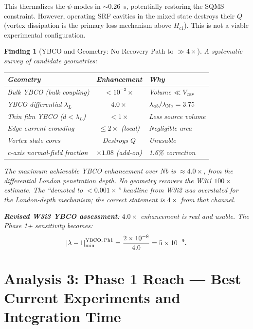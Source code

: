 \documentclass[11pt]{article}
\newtheorem{finding}{Finding}
\newcommand{\ee}[1]{\times 10^{#1}}
\newcommand{\lam}{\lambda}
\begin{document}
This thermalizes the $\psi$-modes in $\sim 0.26$~s, potentially restoring the
SQMS constraint. However, operating SRF cavities in the mixed state destroys
their $Q$ (vortex dissipation is the primary loss mechanism above $H_{c1}$).
This is not a viable experimental configuration.

\begin{finding}[YBCO and Geometry: No Recovery Path to $\gg 4\times$]
\label{find:ybco-geometry}
A systematic survey of candidate geometries:
\begin{center}
\begin{tabular}{lcl}
\toprule
Geometry & Enhancement & Why \\
\midrule
Bulk YBCO (bulk coupling) & $< 10^{-3}\times$ & Volume $\ll V_{\rm cav}$ \\
YBCO differential $\lambda_L$ & $4.0\times$ & $\lambda_{ab}/\lambda_{\rm Nb} = 3.75$ \\
Thin film YBCO ($d < \lambda_L$) & $< 1\times$ & Less source volume \\
Edge current crowding & $\leq 2\times$ (local) & Negligible area \\
Vortex state cores & Destroys $Q$ & Unusable \\
c-axis normal-field fraction & $\times 1.08$ (add-on) & 1.6\% correction \\
\bottomrule
\end{tabular}
\end{center}

The maximum achievable YBCO enhancement over Nb is $\approx 4.0\times$,
from the differential London penetration depth. No geometry recovers
the W3i1 $100\times$ estimate. The ``demoted to $< 0.001\times$'' headline
from W3i2 was overstated for the London-depth mechanism; the correct
statement is $4\times$ from that channel.

\textbf{Revised W3i3 YBCO assessment}: $4.0\times$ enhancement is real
and usable. The Phase 1+ sensitivity becomes:
\begin{equation}
|\lam-1|_{\rm min}^{\rm YBCO,\,Ph1} = \frac{2\ee{-8}}{4.0} = 5\ee{-9}.
\end{equation}
\end{finding}

\section{Analysis 3: Phase 1 Reach --- Best Current Experiments and Integration Time}
\label{sec:phase1-best}
\end{document}
